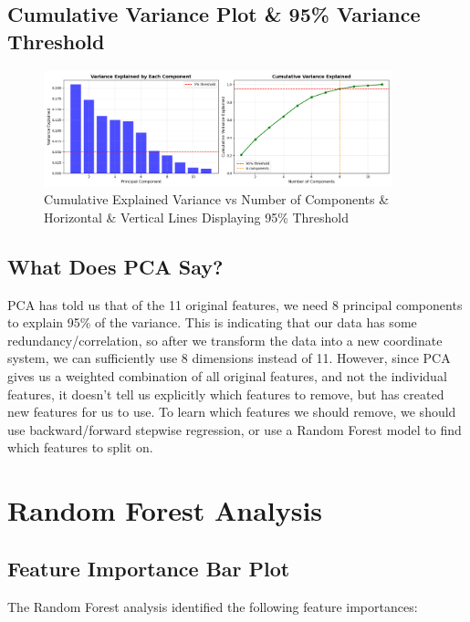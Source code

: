 \documentclass[12pt]{article}
\begin{document}
\subsection{Cumulative Variance Plot \& 95\% Variance Threshold}

\begin{figure}[H]
    \centering
    \includegraphics[width=0.9\textwidth]{images/variance_explained.png}
    \caption{Cumulative Explained Variance vs Number of Components \& Horizontal \& Vertical Lines Displaying 95\% Threshold}
    \label{fig:pca_variance}
\end{figure}

\subsection{What Does PCA Say?}
PCA has told us that of the 11 original features, we need 8 principal components to explain 95\% of the variance. This is indicating that our data has some redundancy/correlation,
so after we transform the data into a new coordinate system, we can sufficiently use 8 dimensions instead of 11. However, since PCA gives us a weighted combination of all original features, and not the individual features,
it doesn't tell us explicitly which features to remove, but has created new features for us to use. To learn which features we should remove, we should use backward/forward stepwise regression, or use a Random Forest model to find which features to split on.

\section{Random Forest Analysis}

\subsection{Feature Importance Bar Plot}

The Random Forest analysis identified the following feature importances:
\end{document}
